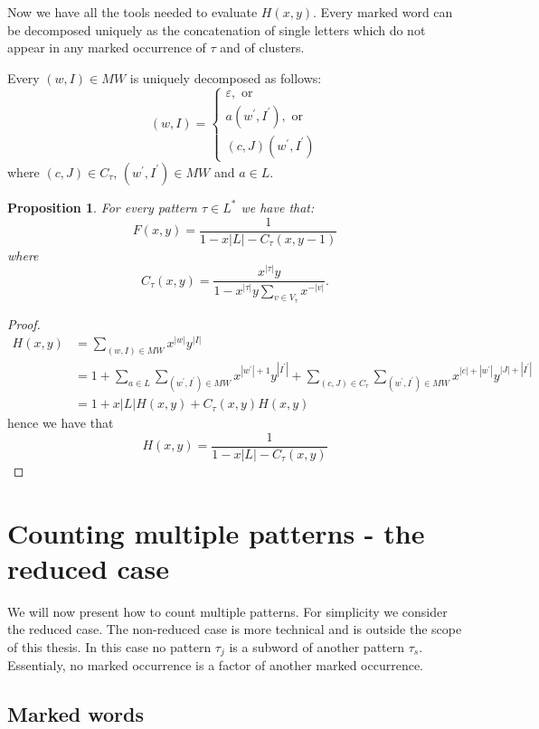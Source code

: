 \documentclass[12pt]{report}
\newtheorem{prop}{Proposition}
\begin{document}
{{\noindent Now we have all the tools needed to evaluate $H(x,y)$. Every marked word can be decomposed uniquely as the concatenation of single letters which do not appear in any marked occurrence of $\tau$ and of clusters.

Every $(w, I) \in MW$ is uniquely decomposed as follows:
\[ (w, I) = \begin{cases} \varepsilon, \textrm{ or }\\
a (w^\prime, I^\prime), \textrm{ or } \\
(c, J) (w^\prime, I^\prime) 
\end{cases}\]
where $(c, J) \in C_{\tau}$, $(w^\prime, I^\prime) \in MW$ and $a \in L$.

\begin{prop} For every pattern $\tau \in L^*$ we have that:
\[ F(x,y) = \frac{1}{1 - x |L| - C_\tau(x,y-1)} \]
where 
\[ C_\tau(x,y) = \frac{x^{|\tau|} y}{1 - x^{|\tau|} y \sum\limits_{v \in V_\tau} x^{-|v|}}. \]
\end{prop}

\begin{proof}
\begin{align*}
H(x,y) 
& = \sum\limits_{(w, I) \in MW} x^{|w|} y^{|I|} \\
& = 1 + \sum\limits_{a \in L} \sum\limits_{(w^\prime, I^\prime) \in MW} x^{|w^\prime| + 1} y^{|I^\prime|} + \sum\limits_{(c, J) \in C_\tau} \sum\limits_{(w^\prime, I^\prime) \in MW} x^{|c| + |w^\prime|} y^{|J| + |I^\prime|} \\
& =  1 + x |L| H(x,y) + C_\tau(x,y) H(x,y)  
\end{align*}
hence we have that
\[ H(x,y) = \frac{1}{1 - x |L| - C_\tau(x,y)} \]
\end{proof}

\section{Counting multiple patterns - the reduced case}

\noindent We will now present how to count multiple patterns. For simplicity we consider the reduced case. The non-reduced case is more technical and is outside the scope of this thesis. In this case no pattern $\tau_j$ is a subword of another pattern $\tau_s$.
Essentialy, no marked occurrence is a factor of another marked occurrence.

\subsection{Marked words}

}}
\end{document}
